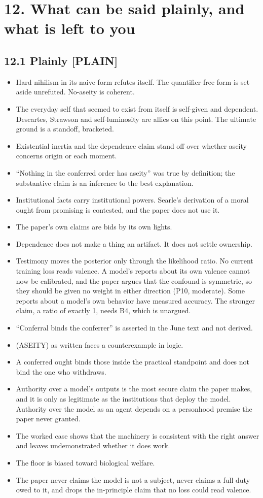 \documentclass[11pt]{article}
\newcommand{\register}[1]{{\ttfamily\small #1}}
\begin{document}
\section*{12. What can be said plainly, and what is left to you}

\subsection*{12.1 Plainly \register{[PLAIN]}}

\begin{itemize}
\item Hard nihilism in its naive form refutes itself. The quantifier-free form is set aside unrefuted. No-aseity is coherent.
\item The everyday self that seemed to exist from itself is self-given and dependent. Descartes, Strawson and self-luminosity are allies on this point. The ultimate ground is a standoff, bracketed.
\item Existential inertia and the dependence claim stand off over whether aseity concerns origin or each moment.
\item ``Nothing in the conferred order has aseity'' was true by definition; the substantive claim is an inference to the best explanation.
\item Institutional facts carry institutional powers. Searle's derivation of a moral ought from promising is contested, and the paper does not use it.
\item The paper's own claims are bids by its own lights.
\item Dependence does not make a thing an artifact. It does not settle ownership.
\item Testimony moves the posterior only through the likelihood ratio. No current training loss reads valence. A model's reports about its own valence cannot now be calibrated, and the paper argues that the confound is symmetric, so they should be given no weight in either direction (P10, moderate). Some reports about a model's own behavior have measured accuracy. The stronger claim, a ratio of exactly 1, needs B4, which is unargued.
\item ``Conferral binds the conferrer'' is asserted in the June text and not derived.
\item (ASEITY) as written faces a counterexample in logic.
\item A conferred ought binds those inside the practical standpoint and does not bind the one who withdraws.
\item Authority over a model's outputs is the most secure claim the paper makes, and it is only as legitimate as the institutions that deploy the model. Authority over the model as an agent depends on a personhood premise the paper never granted.
\item The worked case shows that the machinery is consistent with the right answer and leaves undemonstrated whether it does work.
\item The floor is biased toward biological welfare.
\item The paper never claims the model is not a subject, never claims a full duty owed to it, and drops the in-principle claim that no loss could read valence.
\end{itemize}
\end{document}

